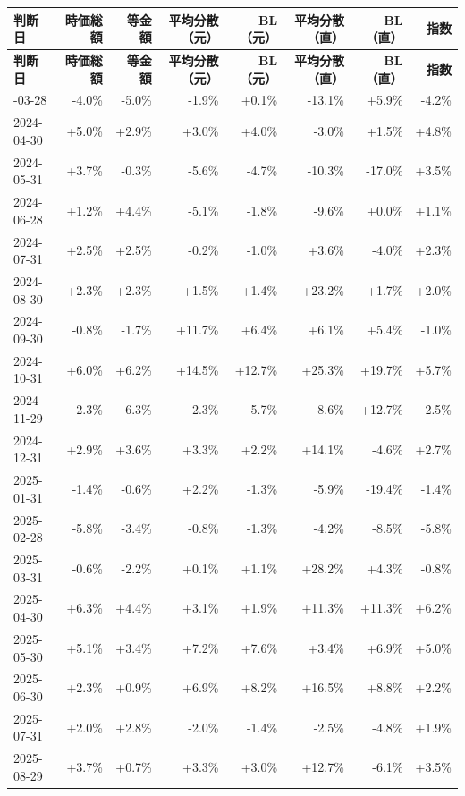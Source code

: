 \documentclass[xelatex,ja=standard,jafont=hiragino-pron,a4paper,10pt]{bxjsreport}
\begin{document}
{\scriptsize
\begin{longtable}{lrrrrrrr}
\toprule
\textbf{判断日} & \textbf{時価総額} & \textbf{等金額} & \textbf{平均分散（元）} & \textbf{BL（元）} & \textbf{平均分散（直）} & \textbf{BL（直）} & \textbf{指数} \\
\midrule
\endfirsthead
\toprule
\textbf{判断日} & \textbf{時価総額} & \textbf{等金額} & \textbf{平均分散（元）} & \textbf{BL（元）} & \textbf{平均分散（直）} & \textbf{BL（直）} & \textbf{指数} \\
\midrule
\endhead
\bottomrule
\endfoot
2024-03-28 & -4.0\% & -5.0\% & -1.9\% & +0.1\% & -13.1\% & +5.9\% & -4.2\% \\
2024-04-30 & +5.0\% & +2.9\% & +3.0\% & +4.0\% & -3.0\% & +1.5\% & +4.8\% \\
2024-05-31 & +3.7\% & -0.3\% & -5.6\% & -4.7\% & -10.3\% & -17.0\% & +3.5\% \\
2024-06-28 & +1.2\% & +4.4\% & -5.1\% & -1.8\% & -9.6\% & +0.0\% & +1.1\% \\
2024-07-31 & +2.5\% & +2.5\% & -0.2\% & -1.0\% & +3.6\% & -4.0\% & +2.3\% \\
2024-08-30 & +2.3\% & +2.3\% & +1.5\% & +1.4\% & +23.2\% & +1.7\% & +2.0\% \\
2024-09-30 & -0.8\% & -1.7\% & +11.7\% & +6.4\% & +6.1\% & +5.4\% & -1.0\% \\
2024-10-31 & +6.0\% & +6.2\% & +14.5\% & +12.7\% & +25.3\% & +19.7\% & +5.7\% \\
2024-11-29 & -2.3\% & -6.3\% & -2.3\% & -5.7\% & -8.6\% & +12.7\% & -2.5\% \\
2024-12-31 & +2.9\% & +3.6\% & +3.3\% & +2.2\% & +14.1\% & -4.6\% & +2.7\% \\
2025-01-31 & -1.4\% & -0.6\% & +2.2\% & -1.3\% & -5.9\% & -19.4\% & -1.4\% \\
2025-02-28 & -5.8\% & -3.4\% & -0.8\% & -1.3\% & -4.2\% & -8.5\% & -5.8\% \\
2025-03-31 & -0.6\% & -2.2\% & +0.1\% & +1.1\% & +28.2\% & +4.3\% & -0.8\% \\
2025-04-30 & +6.3\% & +4.4\% & +3.1\% & +1.9\% & +11.3\% & +11.3\% & +6.2\% \\
2025-05-30 & +5.1\% & +3.4\% & +7.2\% & +7.6\% & +3.4\% & +6.9\% & +5.0\% \\
2025-06-30 & +2.3\% & +0.9\% & +6.9\% & +8.2\% & +16.5\% & +8.8\% & +2.2\% \\
2025-07-31 & +2.0\% & +2.8\% & -2.0\% & -1.4\% & -2.5\% & -4.8\% & +1.9\% \\
2025-08-29 & +3.7\% & +0.7\% & +3.3\% & +3.0\% & +12.7\% & -6.1\% & +3.5\% \\

\end{longtable}}
\end{document}
